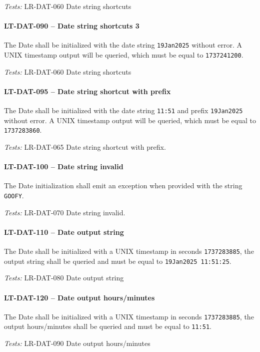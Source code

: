 \textit{Tests: } LR-DAT-060 Date string shortcuts

\paragraph{LT-DAT-090 -- Date string shortcuts 3}
The Date shall be initialized with the date string
\lstinline{19Jan2025} without error.
A UNIX timestamp output will be queried, which must be equal to
\lstinline{1737241200}.

\textit{Tests: } LR-DAT-060 Date string shortcuts

\paragraph{LT-DAT-095 -- Date string shortcut with prefix}
The Date shall be initialized with the date string
\lstinline{11:51} and prefix \lstinline{19Jan2025} without error.
A UNIX timestamp output will be queried, which must be
equal to \lstinline{1737283860}.

\textit{Tests: } LR-DAT-065 Date string shortcut with prefix.

\paragraph{LT-DAT-100 -- Date string invalid}
The Date initialization shall emit an exception when provided
with the string \lstinline{GOOFY}.

\textit{Tests: } LR-DAT-070 Date string invalid.

\paragraph{LT-DAT-110 -- Date output string}
The Date shall be initialized with a UNIX timestamp in seconds
\lstinline{1737283885}, the output string shall be queried and
must be equal to \lstinline{19Jan2025 11:51:25}.

\textit{Tests: } LR-DAT-080 Date output string

\paragraph{LT-DAT-120 -- Date output hours/minutes}
The Date shall be initialized with a UNIX timestamp in seconds
\lstinline{1737283885}, the output hours/minutes shall be queried
and must be equal to \lstinline{11:51}.

\textit{Tests: } LR-DAT-090 Date output hours/minutes

